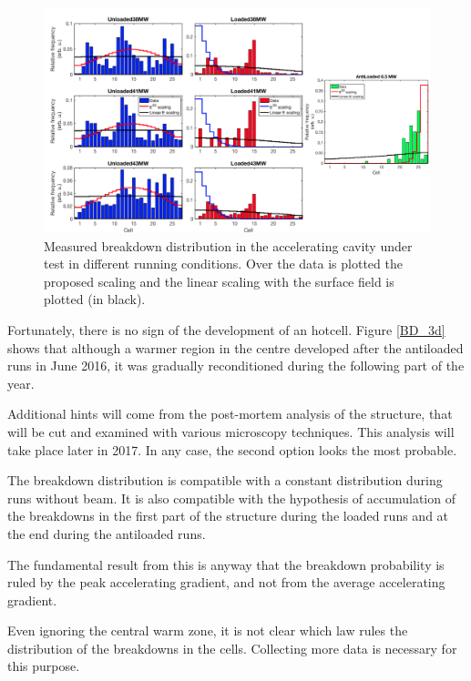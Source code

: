 \begin{landscape}

\begin{figure}[p]
\centering 
\includegraphics[scale=0.53]{pictures/distro_all.png}
\caption{Measured breakdown distribution in the accelerating cavity under test in different running conditions. Over the data is plotted the proposed scaling and the linear scaling with the surface field is plotted (in black).}
\label{BD_distro}
\end{figure}
 
\end{landscape}



Fortunately, there is no sign of the development of an hotcell. Figure \ref{BD_3d} shows that although a warmer region in the centre developed after the antiloaded runs in June 2016, it was gradually reconditioned during the following part of the year. 

Additional hints will come from the post-mortem analysis of the structure, that will be cut and examined with various microscopy techniques. This analysis will take place later in 2017. In any case, the second option looks the most probable. 

The breakdown distribution is compatible with a constant distribution during runs without beam. It is also compatible with the hypothesis of accumulation of the breakdowns in  the first part of the structure during the loaded runs and at the end during the antiloaded runs.

The fundamental result from this is anyway that the breakdown probability is ruled by the peak accelerating gradient, and not from the average accelerating gradient.


Even ignoring the central warm zone, it is not clear which law rules the distribution of the breakdowns in the cells. Collecting more data is necessary for this purpose.

